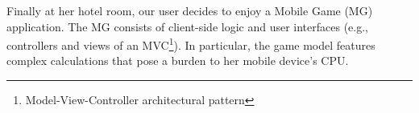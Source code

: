 





Finally at her hotel room, our user 
decides to enjoy a Mobile Game (MG) application. The MG consists of client-side logic and user interfaces (e.g., controllers and views of an MVC\footnote{Model-View-Controller architectural pattern}). In particular, the game model features complex calculations that pose a burden to her mobile device's CPU. 

